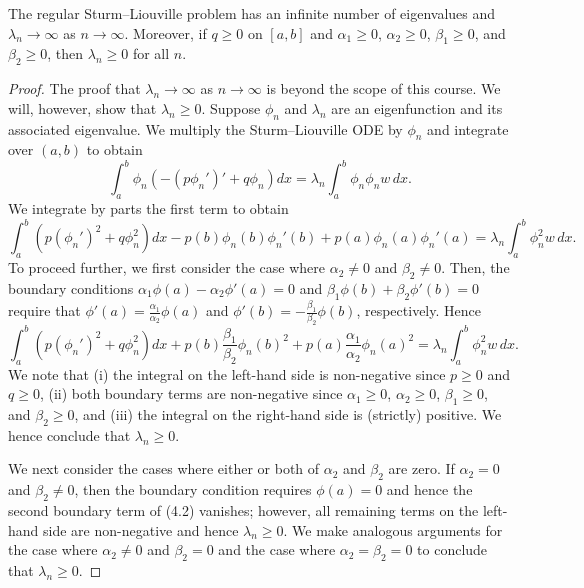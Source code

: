 \begin{theorem}[][4.5]
    The regular Sturm--Liouville problem has an infinite number of eigenvalues and $\lambda_n \to \infty$ as $n \to \infty$. Moreover, if $q \geq 0$ on $[a, b]$ and $\alpha_1 \geq 0$, $\alpha_2 \geq 0$, $\beta_1 \geq 0$, and $\beta_2 \geq 0$, then $\lambda_n \geq 0$ for all $n$.
\end{theorem}
\begin{proof}
    The proof that $\lambda_n \to \infty$ as $n \to \infty$ is beyond the scope of this course. We will, however, show that $\lambda_n \geq 0$. Suppose $\phi_n$ and $\lambda_n$ are an eigenfunction and its associated eigenvalue. We multiply the Sturm--Liouville ODE by $\phi_n$ and integrate over $(a, b)$ to obtain
    \[\int_a^b \phi_n (-(p\phi_n')' + q\phi_n) dx = \lambda_n \int_a^b \phi_n \phi_n w\,dx.\]
    We integrate by parts the first term to obtain
    \[\int_a^b (p(\phi_n')^2 + q\phi_n^2) dx - p(b)\phi_n(b)\phi_n'(b) + p(a)\phi_n(a)\phi_n'(a) = \lambda_n \int_a^b \phi_n^2 w\,dx.\]
    To proceed further, we first consider the case where $\alpha_2 \neq 0$ and $\beta_2 \neq 0$. Then, the boundary conditions $\alpha_1 \phi(a) - \alpha_2 \phi'(a) = 0$ and $\beta_1 \phi(b) + \beta_2 \phi'(b) = 0$ require that $\phi'(a) = \frac{\alpha_1}{\alpha_2} \phi(a)$ and $\phi'(b) = -\frac{\beta_1}{\beta_2} \phi(b)$, respectively. Hence
    \begin{equation*}
        \int_a^b (p(\phi_n')^2 + q\phi_n^2) dx + p(b) \frac{\beta_1}{\beta_2} \phi_n(b)^2 + p(a) \frac{\alpha_1}{\alpha_2} \phi_n(a)^2 = \lambda_n \int_a^b \phi_n^2 w\,dx. \tag{4.2}
    \end{equation*}
    We note that (i) the integral on the left-hand side is non-negative since $p \geq 0$ and $q \geq 0$, (ii) both boundary terms are non-negative since $\alpha_1 \geq 0$, $\alpha_2 \geq 0$, $\beta_1 \geq 0$, and $\beta_2 \geq 0$, and (iii) the integral on the right-hand side is (strictly) positive. We hence conclude that $\lambda_n \geq 0$.

    We next consider the cases where either or both of $\alpha_2$ and $\beta_2$ are zero. If $\alpha_2 = 0$ and $\beta_2 \neq 0$, then the boundary condition requires $\phi(a) = 0$ and hence the second boundary term of (4.2) vanishes; however, all remaining terms on the left-hand side are non-negative and hence $\lambda_n \geq 0$. We make analogous arguments for the case where $\alpha_2 \neq 0$ and $\beta_2 = 0$ and the case where $\alpha_2 = \beta_2 = 0$ to conclude that $\lambda_n \geq 0$.
\end{proof}

